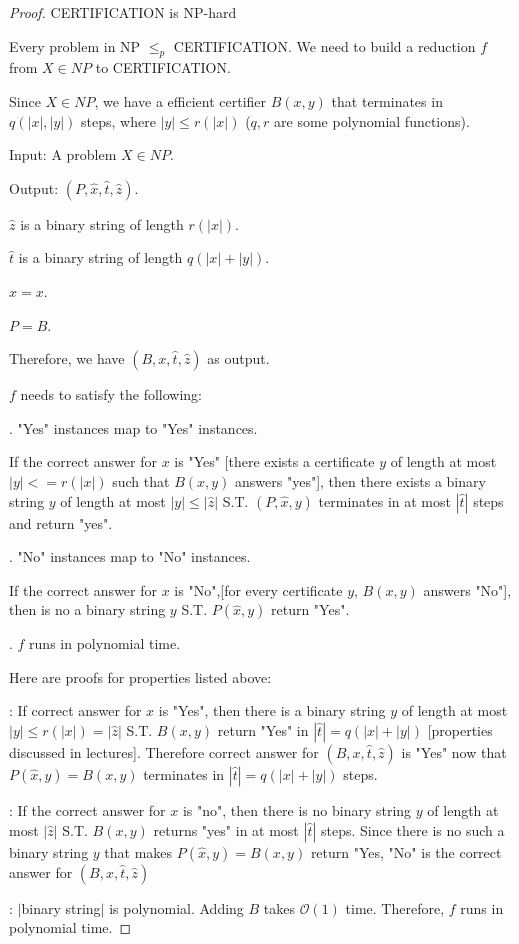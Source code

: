 \documentclass[openany]{article}
\begin{document}
\begin{proof}{CERTIFICATION is NP-hard}

Every problem in NP $\leqslant_p$ CERTIFICATION. We need to build a reduction $f$ from $X \in NP$ to CERTIFICATION.

Since $X\in NP$, we have a efficient certifier $B(x,y)$ that terminates in $q(|x|,|y|)$ steps, where $|y| \leqslant r(|x|)$ ($q, r$ are some polynomial functions).

Input: A problem $X\in NP$.

Output: $(P, \hat{x}, \hat{t}, \hat{z})$.

\qquad $\hat{z}$ is a binary string of length $r(|x|)$.

\qquad $\hat{t}$ is a binary string of length $q(|x|+|y|)$.

\qquad $\hat{x} = x$. 


\qquad $P=B$.

Therefore, we have $(B, x, \hat{t}, \hat{z})$ as output.

$f$ needs to satisfy the following:

. "Yes" instances map to "Yes" instances.

\qquad If the correct answer for $x$ is "Yes" [there exists a certificate $y$ of length at most $|y| <= r(|x|)$ such that $B(x,y)$ answers "yes"], then there exists a binary string $y$ of length at most $|y| \leqslant |\hat{z}|$ S.T. $(P, \hat{x}, y)$ terminates in at most $|\hat{t}|$ steps and return "yes".


. "No" instances map to "No" instances.

\qquad If the correct answer for $x$ is "No",[for every certificate $y$, $B(x,y)$ answers "No"], then is no a binary string $y$ S.T. $P(\hat{x},y)$ return "Yes".

. $f$ runs in polynomial time.

Here are proofs for properties listed above:

: If correct answer for $x$ is "Yes", then there is a binary string $y$ of length at most $|y| \leqslant r(|x|) = |\hat{z}|$ S.T. $B(x,y)$ return "Yes" in $|\hat{t}| = q(|x|+|y|)$ [properties discussed in lectures]. Therefore correct answer for $(B, x, \hat{t}, \hat{z})$ is "Yes" now that $P(\hat{x},y) = B(x,y)$ terminates in $|\hat{t}| = q(|x|+|y|)$ steps.

: If the correct answer for $x$ is "no", then there is no binary string $y$ of length at most $|\hat{z}|$ S.T. $B(x,y)$ returns "yes" in at most $|\hat{t}|$ steps. Since there is no such a binary string $y$ that makes $P(\hat{x},y) = B(x,y)$ return "Yes, "No" is the correct answer for $(B,x,\hat{t},\hat{z})$


: $|$binary string$|$ is polynomial. Adding $B$ takes $\mathcal{O}(1)$ time. Therefore, $f$ runs in polynomial time.








    
\end{proof}
\end{document}

